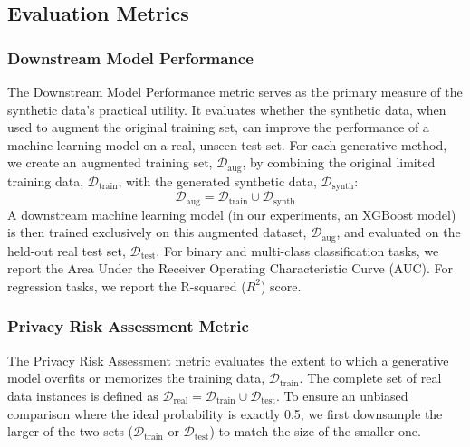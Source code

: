 \subsection{Evaluation Metrics}
\label{app:metrics}

\subsubsection{Downstream Model Performance}
The Downstream Model Performance metric serves as the primary measure of the synthetic data's practical utility. It evaluates whether the synthetic data, when used to augment the original training set, can improve the performance of a machine learning model on a real, unseen test set. For each generative method, we create an augmented training set, $\mathcal{D}_{\text{aug}}$, by combining the original limited training data, $\mathcal{D}_{\text{train}}$, with the generated synthetic data, $\mathcal{D}_{\text{synth}}$:
\begin{equation}
    \mathcal{D}_{\text{aug}} = \mathcal{D}_{\text{train}} \cup \mathcal{D}_{\text{synth}}
\end{equation}
A downstream machine learning model (in our experiments, an XGBoost model) is then trained exclusively on this augmented dataset, $\mathcal{D}_{\text{aug}}$, and evaluated on the held-out real test set, $\mathcal{D}_{\text{test}}$. For binary and multi-class classification tasks, we report the Area Under the Receiver Operating Characteristic Curve (AUC). For regression tasks, we report the R-squared ($R^2$) score.

\subsubsection{Privacy Risk Assessment Metric}
\label{app:privacy_metric}
The Privacy Risk Assessment metric evaluates the extent to which a generative model overfits or memorizes the training data, $\mathcal{D}_{\text{train}}$. The complete set of real data instances is defined as $\mathcal{D}_{\text{real}} = \mathcal{D}_{\text{train}} \cup \mathcal{D}_{\text{test}}$. To ensure an unbiased comparison where the ideal probability is exactly 0.5, we first downsample the larger of the two sets ($\mathcal{D}_{\text{train}}$ or $\mathcal{D}_{\text{test}}$) to match the size of the smaller one.

